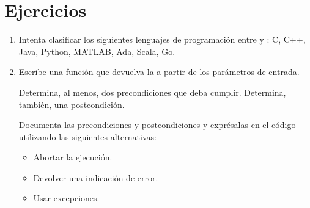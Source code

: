 \section{Ejercicios}

\begin{enumerate}

\item Intenta clasificar los siguientes lenguajes de programación entre 
       y :
      C, C++, Java, Python, MATLAB, Ada, Scala, Go.

\item Escribe una función  que devuelva la 
      a partir de los parámetros de entrada.

      Determina, al menos, dos precondiciones que deba cumplir.
      Determina, también, una postcondición.

      Documenta las precondiciones y postcondiciones y exprésalas en el código 
      utilizando las siguientes alternativas:
      \begin{itemize}
        \item Abortar la ejecución.
        \item Devolver una indicación de error.
        \item Usar excepciones.
      \end{itemize}

\end{enumerate}

